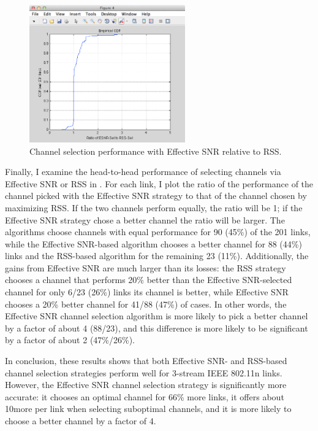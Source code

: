 \begin{figure}[htp]
	\centering
	\includegraphics[width=0.6\textwidth]{figures/esnr/chan_sel_ratio.png}
	\caption{\label{fig:chan_sel_ratio}Channel selection performance with Effective SNR relative to RSS\@.}
\end{figure}

Finally, I examine the head-to-head performance of selecting channels via Effective SNR or RSS in . For each link, I plot the ratio of the performance of the channel picked with the Effective SNR strategy to that of the channel chosen by maximizing RSS\@. If the two channels perform equally, the ratio will be 1; if the Effective SNR strategy chose a better channel the ratio will be larger. The algorithms choose channels with equal performance for 90 (45\%) of the 201 links, while the Effective SNR-based algorithm chooses a better channel for 88 (44\%) links and the RSS-based algorithm for the remaining 23 (11\%). Additionally, the gains from Effective SNR are much larger than its losses: the RSS strategy chooses a channel that performs 20\% better than the Effective SNR-selected channel for only 6/23 (26\%) links its channel is better, while Effective SNR chooses a 20\% better channel for 41/88 (47\%) of cases. In other words, the Effective SNR channel selection algorithm is more likely to pick a better channel by a factor of about 4 (88/23), and this difference is more likely to be significant by a factor of about 2 (47\%/26\%).

In conclusion, these results shows that both Effective SNR- and RSS-based channel selection strategies perform well for 3-stream IEEE 802.11n links. However, the Effective SNR channel selection strategy is significantly more accurate: it chooses an optimal channel for 66\% more links, it offers about 10\Mbps more per link when selecting suboptimal channels, and it is more likely to choose a better channel by a factor of 4.

